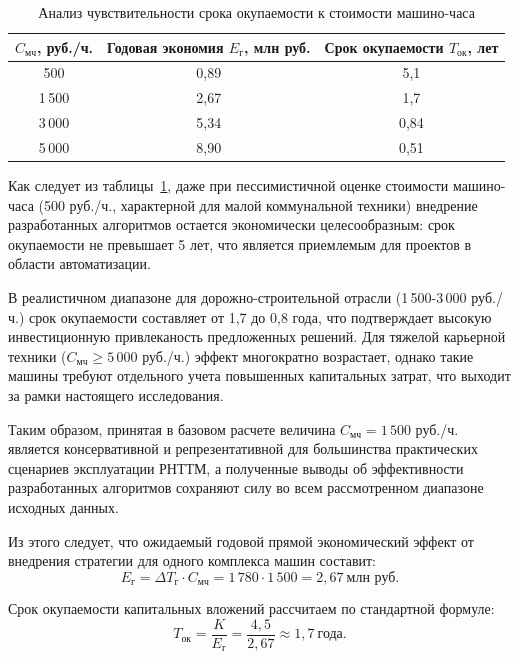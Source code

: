 \begin{table}[h!]
	\centering
	\caption{Анализ чувствительности срока окупаемости к стоимости машино-часа}
	\label{tab:sensitivity}
	\begin{tabular}{|c|c|c|}
		\hline
		$ C_{\text{мч}} $, руб./ч. & Годовая экономия $ E_{\text{г}} $, млн руб. & Срок окупаемости $ T_{\text{ок}} $, лет \\
		\hline
		500   & 0,89  & 5,1 \\
		1\,500 & 2,67  & 1,7 \\
		3\,000 & 5,34  & 0,84 \\
		5\,000 & 8,90  & 0,51 \\
		\hline
	\end{tabular}
\end{table}

Как следует из таблицы~\ref{tab:sensitivity}, даже при пессимистичной оценке стоимости машино-часа (500 руб./ч., характерной для малой коммунальной техники) внедрение разработанных алгоритмов остается экономически целесообразным: срок окупаемости не превышает 5 лет, что является приемлемым для проектов в области автоматизации.

В реалистичном диапазоне для дорожно-строительной отрасли (1\,500-3\,000 руб./ч.) срок окупаемости составляет от 1,7 до 0,8 года, что подтверждает высокую инвестиционную привлеканость предложенных решений. Для тяжелой карьерной техники ($ C_{\text{мч}} \geq 5\,000 $ руб./ч.) эффект многократно возрастает, однако такие машины требуют отдельного учета повышенных капитальных затрат, что выходит за рамки настоящего исследования.

Таким образом, принятая в базовом расчете величина $ C_{\text{мч}} = 1\,500 $ руб./ч. является консервативной и репрезентативной для большинства практических сценариев эксплуатации РНТТМ, а полученные выводы об эффективности разработанных алгоритмов сохраняют силу во всем рассмотренном диапазоне исходных данных.

Из этого следует, что ожидаемый годовой прямой экономический эффект от внедрения стратегии для одного комплекса машин составит:
\begin{equation}
	E_{\text{г}} = \Delta T_{\text{г}} \cdot C_{\text{мч}} = 1\,780 \cdot 1\,500 = 2{,}67 \ \text{млн руб.}
\end{equation}

Срок окупаемости капитальных вложений рассчитаем по стандартной формуле:
\begin{equation}
	T_{\text{ок}} = \frac{K}{E_{\text{г}}} = \frac{4{,}5}{2{,}67} \approx 1{,}7 \ \text{года}.
\end{equation}

